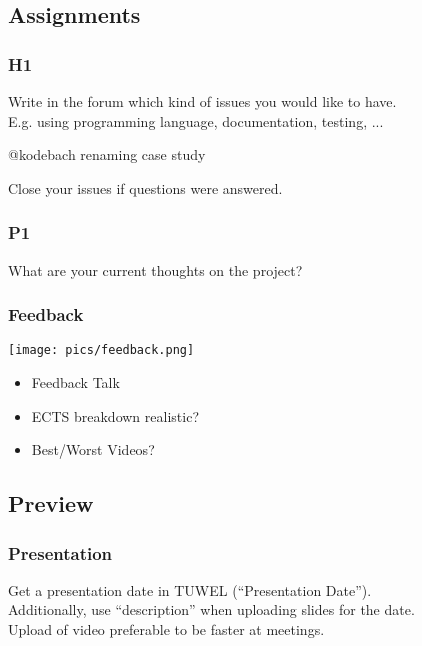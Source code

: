\breakframe

\subsection{Assignments}

\begin{assignment}
	\frametitle{H1}

	\begin{task}
	Write in the forum which kind of issues you would like to have. \\
	E.g. using programming language, documentation, testing, ...
	\end{task}

	\pause

	\begin{task}
	@kodebach renaming case study
	\end{task}

	\pause

	\begin{task}
	Close your issues if questions were answered.
	\end{task}
\end{assignment}

\begin{assignment}
	\frametitle{P1}

	\begin{task}
	What are your current thoughts on the project?
	\end{task}
\end{assignment}

\begin{frame}
	\frametitle{Feedback}

	\hfill \texttt{[image: pics/feedback.png]}
	\vspace{-1cm}
	\begin{itemize}
		\item Feedback Talk
		\item ECTS breakdown realistic?
		\item Best/Worst Videos?
	\end{itemize}
\end{frame}

\subsection{Preview}

\begin{assignment}
	\frametitle{Presentation}

	\begin{task}
	Get a presentation date in TUWEL (``Presentation Date''). \\
	Additionally, use ``description'' when uploading slides for the date. \\
	Upload of video preferable to be faster at meetings.
	\end{task}
\end{assignment}

